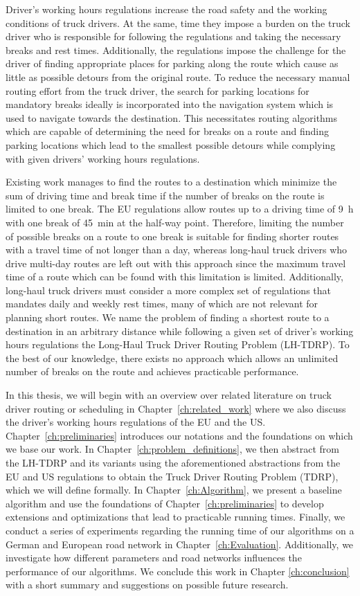 Driver's working hours regulations increase the road safety and the working conditions of truck drivers. At the same, time they impose a burden on the truck driver who is responsible for following the regulations and taking the necessary breaks and rest times. Additionally, the regulations impose the challenge for the driver of finding appropriate places for parking along the route which cause as little as possible detours from the original route. To reduce the necessary manual routing effort from the truck driver, the search for parking locations for mandatory breaks ideally is incorporated into the navigation system which is used to navigate towards the destination. This necessitates routing algorithms which are capable of determining the need for breaks on a route and finding parking locations which lead to the smallest possible detours while complying with given drivers' working hours regulations.

Existing work manages to find the routes to a destination which minimize the sum of driving time and break time if the number of breaks on the route is limited to one break. The EU regulations allow routes up to a driving time of \SI{9}{\hour} with one break of \SI{45}{\minute} at the half-way point. Therefore, limiting the number of possible breaks on a route to one break is suitable for finding shorter routes with a travel time of not longer than a day, whereas long-haul truck drivers who drive multi-day routes are left out with this approach since the maximum travel time of a route which can be found with this limitation is limited. Additionally, long-haul truck drivers must consider a more complex set of regulations that mandates daily and weekly rest times, many of which are not relevant for planning short routes. We name the problem of finding a shortest route to a destination in an arbitrary distance while following a given set of driver's working hours regulations the Long-Haul Truck Driver Routing Problem (LH-TDRP). To the best of our knowledge, there exists no approach which allows an unlimited number of breaks on the route and achieves practicable performance.

In this thesis, we will begin with an overview over related literature on truck driver routing or scheduling in Chapter~\ref{ch:related_work} where we also discuss the driver's working hours regulations of the EU and the US. Chapter~\ref{ch:preliminaries} introduces our notations and the foundations on which we base our work. In Chapter~\ref{ch:problem_definitions}, we then abstract from the LH-TDRP and its variants using the aforementioned abstractions from the EU and US regulations to obtain the Truck Driver Routing Problem (TDRP), which we will define formally. In Chapter~\ref{ch:Algorithm}, we present a baseline algorithm and use the foundations of Chapter~\ref{ch:preliminaries} to develop extensions and optimizations that lead to practicable running times. Finally, we conduct a series of experiments regarding the running time of our algorithms on a German and European road network in Chapter~\ref{ch:Evaluation}. Additionally, we investigate how different parameters and road networks influences the performance of our algorithms. We conclude this work in Chapter \ref{ch:conclusion} with a short summary and suggestions on possible future research.